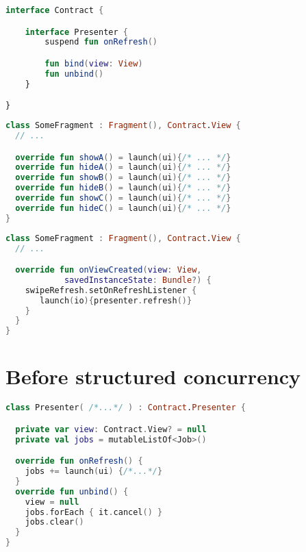 \documentclass[10pt]{beamer}
\begin{document}
\begin{frame}[fragile]
\begin{lstlisting}[language=Kotlin, basicstyle=\ttfamily]
interface Contract {

    interface Presenter {
        suspend fun onRefresh()

        fun bind(view: View)
        fun unbind()
    }

}
\end{lstlisting}
\end{frame}
\begin{frame}[fragile]
\begin{lstlisting}[language=Kotlin, basicstyle=\ttfamily]
class SomeFragment : Fragment(), Contract.View {
  // ...

  override fun showA() = launch(ui){/* ... */}
  override fun hideA() = launch(ui){/* ... */}
  override fun showB() = launch(ui){/* ... */}
  override fun hideB() = launch(ui){/* ... */}
  override fun showC() = launch(ui){/* ... */}
  override fun hideC() = launch(ui){/* ... */}
}
\end{lstlisting}
\end{frame}

\begin{frame}[fragile]
\begin{lstlisting}[language=Kotlin, basicstyle=\ttfamily]
class SomeFragment : Fragment(), Contract.View {
  // ...

  override fun onViewCreated(view: View, 
            savedInstanceState: Bundle?) {
    swipeRefresh.setOnRefreshListener { 
       launch(io){presenter.refresh()}
    }
  }
}
\end{lstlisting}
\end{frame}


\section{Before structured concurrency}

\begin{frame}[fragile]
\begin{lstlisting}[language=Kotlin, basicstyle=\ttfamily]
class Presenter( /*...*/ ) : Contract.Presenter {

  private var view: Contract.View? = null
  private val jobs = mutableListOf<Job>()

  override fun onRefresh() {
    jobs += launch(ui) {/*...*/}
  }
  override fun unbind() {
    view = null
    jobs.forEach { it.cancel() } 
    jobs.clear() 
  }
}
\end{lstlisting}
\end{frame}
\end{document}
